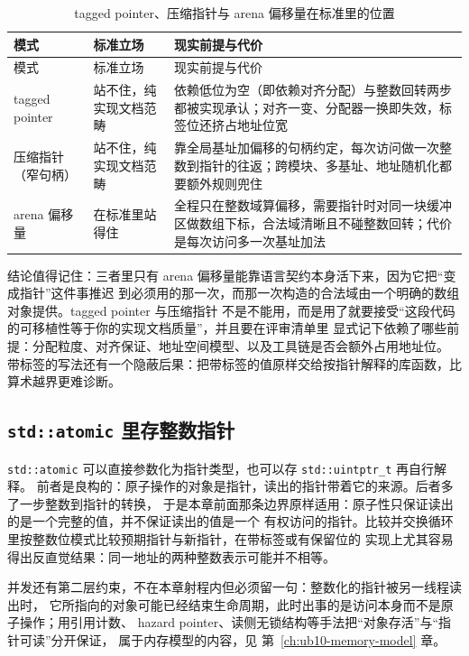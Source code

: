 \documentclass[12pt,a4paper,fontset=fandol]{ctexbook}
\newcommand{\Tp}[1]{\texttt{#1}}
\begin{document}
\begin{longtable}{@{}>{\raggedright\arraybackslash}p{} >{\raggedright\arraybackslash}p{} >{\raggedright\arraybackslash}p{}@{}}
\caption{tagged pointer、压缩指针与 arena 偏移量在标准里的位置}\label{tab:ub05-packed}\\
\toprule
模式 & 标准立场 & 现实前提与代价 \\
\midrule
\endfirsthead
\toprule
模式 & 标准立场 & 现实前提与代价 \\
\midrule
\endhead
\bottomrule
\endfoot
tagged pointer & 站不住，纯实现文档范畴 & 依赖低位为空（即依赖对齐分配）与整数回转两步都被实现承认；对齐一变、分配器一换即失效，标签位还挤占地址位宽 \\
压缩指针（窄句柄） & 站不住，纯实现文档范畴 & 靠全局基址加偏移的句柄约定，每次访问做一次整数到指针的往返；跨模块、多基址、地址随机化都要额外规则兜住 \\
arena 偏移量 & 在标准里站得住 & 全程只在整数域算偏移，需要指针时对同一块缓冲区做数组下标，合法域清晰且不碰整数回转；代价是每次访问多一次基址加法 \\
\end{longtable}

结论值得记住：三者里只有 arena 偏移量能靠语言契约本身活下来，因为它把“变成指针”这件事推迟
到必须用的那一次，而那一次构造的合法域由一个明确的数组对象提供。tagged pointer 与压缩指针
不是不能用，而是用了就要接受“这段代码的可移植性等于你的实现文档质量”，并且要在评审清单里
显式记下依赖了哪些前提：分配粒度、对齐保证、地址空间模型、以及工具链是否会额外占用地址位。
带标签的写法还有一个隐蔽后果：把带标签的值原样交给按指针解释的库函数，比算术越界更难诊断。

\subsection{\Tp{std::atomic} 里存整数指针}\label{sec:ub05-atomic}

\Tp{std::atomic} 可以直接参数化为指针类型，也可以存 \Tp{std::uintptr\_t} 再自行解释。
前者是良构的：原子操作的对象是指针，读出的指针带着它的来源。后者多了一步整数到指针的转换，
于是本章前面那条边界原样适用：原子性只保证读出的是一个完整的值，并不保证读出的值是一个
有权访问的指针。比较并交换循环里按整数位模式比较预期指针与新指针，在带标签或有保留位的
实现上尤其容易得出反直觉结果：同一地址的两种整数表示可能并不相等。

并发还有第二层约束，不在本章射程内但必须留一句：整数化的指针被另一线程读出时，
它所指向的对象可能已经结束生命周期，此时出事的是访问本身而不是原子操作；用引用计数、
hazard pointer、读侧无锁结构等手法把“对象存活”与“指针可读”分开保证，
属于内存模型的内容，见 第~\ref{ch:ub10-memory-model} 章。
\end{document}
